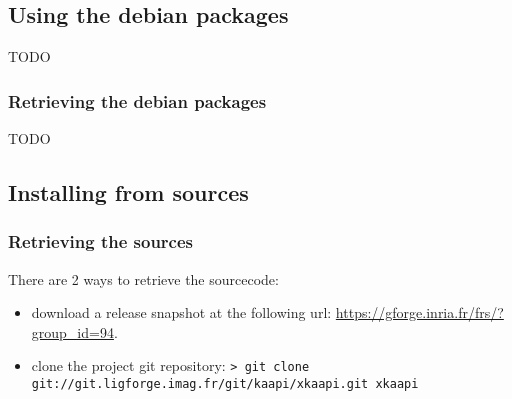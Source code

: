 \documentclass{article}
\begin{document}
\subsection{Using the debian packages}
TODO
\subsubsection{Retrieving the debian packages}
TODO

\subsection{Installing from sources}

\subsubsection{Retrieving the sources}
There are 2 ways to retrieve the sourcecode:
\begin{itemize}
\item download a release snapshot at the following url:\newline
\url{https://gforge.inria.fr/frs/?group_id=94}.
\item clone the project git repository:\newline
\verb+> git clone git://git.ligforge.imag.fr/git/kaapi/xkaapi.git xkaapi+
\end{itemize}
\end{document}
